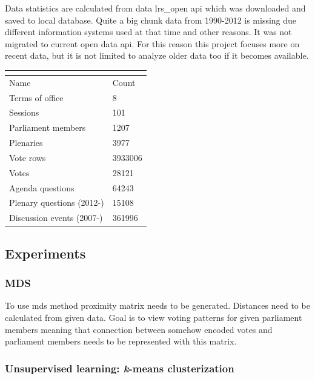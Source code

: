 \documentclass[a4paper,12pt]{article}
\begin{document}
   	Data statistics are calculated from data \gls{lrs_open} \acrshort{api} which was downloaded and saved to local database. Quite a big chunk data from 1990-2012 is missing due different information systems used at that time and other reasons. It was not migrated to current open data \acrshort{api}. For this reason this project focuses more on recent data, but it is not limited to analyze older data too if it becomes available.
    
   	\noindent
    \begin{center}
    	\begin{tabular}{L{5cm} R{3cm}}
    		\\ 
    		\hline
    		Name & Count \\\hline
    		Terms of office & 8\\
    		Sessions & 101\\
    		Parliament members & 1207\\
    		Plenaries & 3977\\
    		Vote rows & 3933006\\
    		Votes & 28121\\
    		Agenda questions & 64243\\
    		Plenary questions (2012-) & 15108\\
    		Discussion events (2007-) & 361996\\
    		\hline
    	\end{tabular}
    	 \label{tab:data_statistics}
    \end{center}

    
    \hfill
    
    
   	\subsection{Experiments}
   	\subsubsection{MDS}
   	
   	To use \acrshort{mds} method proximity matrix needs to be generated. Distances need to be calculated from given data. Goal is to view voting patterns for given parliament members meaning that connection between somehow encoded votes and parliament members needs to be represented with this matrix.
   	   	
   	
   	\subsubsection{Unsupervised learning: {\textit k-means} clusterization }
   	
\end{document}
